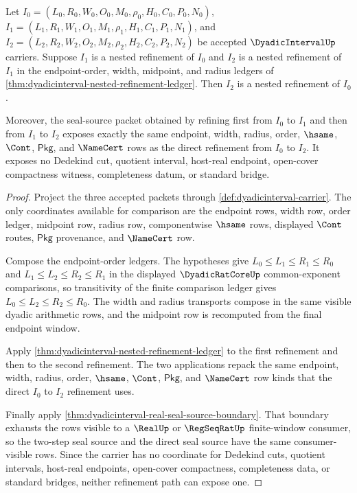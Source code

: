 \begin{theorem}
\label{thm:dyadicinterval-nested-window-composition}
Let $I_0=(L_0,R_0,W_0,O_0,M_0,\rho_0,H_0,C_0,P_0,N_0)$,
$I_1=(L_1,R_1,W_1,O_1,M_1,\rho_1,H_1,C_1,P_1,N_1)$, and
$I_2=(L_2,R_2,W_2,O_2,M_2,\rho_2,H_2,C_2,P_2,N_2)$ be accepted
$\DyadicIntervalUp$ carriers. Suppose $I_1$ is a nested refinement of $I_0$
and $I_2$ is a nested refinement of $I_1$ in the endpoint-order, width,
midpoint, and radius ledgers of \autoref{thm:dyadicinterval-nested-refinement-ledger}.
Then $I_2$ is a nested refinement of $I_0$.

Moreover, the seal-source packet obtained by refining first from $I_0$ to
$I_1$ and then from $I_1$ to $I_2$ exposes exactly the same endpoint, width,
radius, order, $\hsame$, $\Cont$, $\mathsf{Pkg}$, and $\NameCert$ rows as the
direct refinement from $I_0$ to $I_2$. It exposes no Dedekind cut, quotient
interval, host-real endpoint, open-cover compactness witness, completeness
datum, or standard bridge.
\end{theorem}
\begin{proof}
Project the three accepted packets through \autoref{def:dyadicinterval-carrier}.
The only coordinates available for comparison are the endpoint rows, width
row, order ledger, midpoint row, radius row, componentwise $\hsame$ rows,
displayed $\Cont$ routes, $\mathsf{Pkg}$ provenance, and $\NameCert$ row.

Compose the endpoint-order ledgers. The hypotheses give
$L_0\leq L_1\leq R_1\leq R_0$ and $L_1\leq L_2\leq R_2\leq R_1$ in the
displayed $\DyadicRatCoreUp$ common-exponent comparisons, so transitivity of
the finite comparison ledger gives $L_0\leq L_2\leq R_2\leq R_0$. The
width and radius transports compose in the same visible dyadic arithmetic
rows, and the midpoint row is recomputed from the final endpoint window.

Apply \autoref{thm:dyadicinterval-nested-refinement-ledger} to the first
refinement and then to the second refinement. The two applications repack the
same endpoint, width, radius, order, $\hsame$, $\Cont$, $\mathsf{Pkg}$, and
$\NameCert$ row kinds that the direct $I_0$ to $I_2$ refinement uses.

Finally apply \autoref{thm:dyadicinterval-real-seal-source-boundary}. That
boundary exhausts the rows visible to a $\RealUp$ or $\RegSeqRatUp$
finite-window consumer, so the two-step seal source and the direct seal source
have the same consumer-visible rows. Since the carrier has no coordinate for
Dedekind cuts, quotient intervals, host-real endpoints, open-cover compactness,
completeness data, or standard bridges, neither refinement path can expose
one.
\end{proof}

